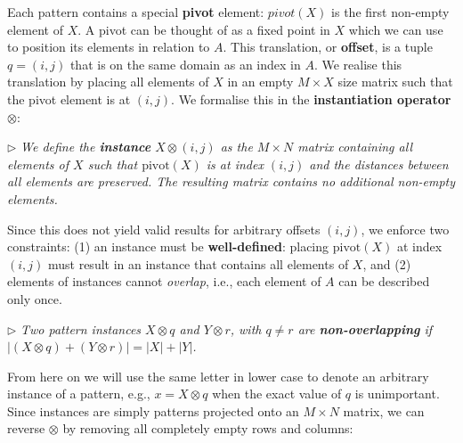 \documentclass{llncs}
\begin{document}
Each pattern contains a special \textbf{pivot} element: %
$pivot(X)$ is the first non-empty element of $X$. %
\noindent
A pivot can be thought of as a fixed point in $X$ which we can use to position its elements in relation to $A$. This translation, or \textbf{offset}, is a tuple ${q}=(i,j)$ that is on the same domain as an index in $A$. We realise this translation by placing all elements of $X$ in an empty $M\times X$ size matrix such that the pivot element is at $(i,j)$. We formalise this in the \textbf{instantiation operator} $\otimes$:

\smallskip
\noindent $\triangleright$
\emph{We define the \textbf{instance} $X \otimes {(i,j)}$ as the $M\times N$ matrix containing all elements of $X$ such that $\mathrm{pivot}(X)$ is at index $(i,j)$ and the distances between all elements are preserved. The resulting matrix contains no additional non-empty elements. } %
\smallskip

Since this does not yield valid results for arbitrary offsets $(i,j)$, we enforce two constraints: (1) an instance must be \textbf{well-defined}: placing $\mathrm{pivot}(X)$ at index $(i,j)$ must result in an instance that contains all elements of $X$, and (2) elements of instances cannot \emph{overlap}, i.e., each element of $A$ can be described only once. %

\smallskip
\noindent $\triangleright$
\emph{Two pattern instances $X \otimes {q}$ and $Y \otimes {r}$, with ${q} \neq {r}$ are \textbf{non-overlapping} if $|(X \otimes {q}) + (Y \otimes {r})| = |X|+|Y|$.}
\smallskip

From here on we will use the same letter in lower case to denote an arbitrary instance of a pattern, e.g., $x = X \otimes {q}$ when the exact value of ${q}$ is unimportant. Since instances are simply patterns projected onto an $M\times N$ matrix, we can reverse $\otimes$ by removing all completely empty rows and columns:
\end{document}
